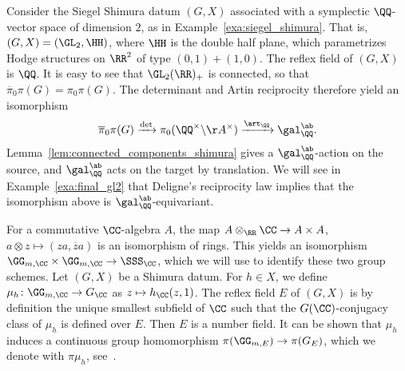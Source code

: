 \begin{example}\label{exa:gl2_reciprocity}
Consider the Siegel Shimura datum $(G,X)$ associated with a symplectic $\QQ$-vector space of dimension $2$, as in Example~\ref{exa:siegel_shimura}. That is, $(G,X) = (\GL_2,\HH)$, where $\HH$ is the double half plane, which parametrizes Hodge structures on $\RR^{2}$ of type $(0,1) + (1,0)$. The reflex field of $(G,X)$ is $\QQ$. It is easy to see that $\GL_2(\RR)_+$ is connected, so that $\overline{\pi}_0 \pi(G) = \pi_0 \pi(G)$. The determinant and Artin reciprocity therefore yield an isomorphism
\begin{equation}\label{eq:det_gl2}
    \overline{\pi}_0 \pi(G) \xrightarrow{\det} \pi_0(\QQ^{\times} \backslash \AA^{\times}) \xrightarrow{\art_{\QQ}} \gal_{\QQ}^{\ab}.
\end{equation}
Lemma~\ref{lem:connected_components_shimura} gives a $\gal_{\QQ}^{\ab}$-action on the source, and $\gal_{\QQ}^{\ab}$ acts on the target by translation. We will see in Example~\ref{exa:final_gl2} that Deligne's reciprocity law implies that the isomorphism above is $\gal_{\QQ}^{\ab}$-equivariant.
\end{example}



For a commutative $\CC$-algebra $A$, the map $A \otimes_{\RR} \CC \rightarrow A \times A$, $a \otimes z \mapsto (za,\overline{z}a)$ is an isomorphism of rings. This yields an isomorphism $\GG_{m,\CC} \times \GG_{m,\CC} \rightarrow \SSS_{\CC}$, which we will use to identify these two group schemes. Let $(G,X)$ be a Shimura datum. For $h \in X$, we define $\mu_h\colon \GG_{m,\CC} \rightarrow G_{\CC}$ as $z \mapsto h_{\CC}(z,1)$. The reflex field $E$ of $(G,X)$ is by definition the unique smallest subfield of $\CC$ such that the $G(\CC)$-conjugacy class of $\mu_h$ is defined over $E$. Then $E$ is a number field. It can be shown that $\mu_h$ induces a continuous group homomorphism $\pi(\GG_{m,E}) \rightarrow \pi(G_E)$, which we denote with $\pi \mu_h$, see~\cite[\S 2.4]{Deligne79}.

